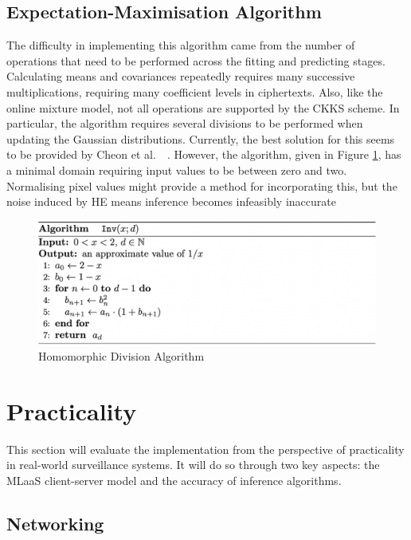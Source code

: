 \subsection{Expectation-Maximisation Algorithm}
\setlength{\leftskip}{0.5cm}
\indent \indent
The difficulty in implementing this algorithm came from the number of operations that need to be performed across the fitting and predicting stages. Calculating means and covariances repeatedly requires many successive multiplications, requiring many coefficient levels in ciphertexts. Also, like the online mixture model, not all operations are supported by the CKKS scheme. In particular, the algorithm requires several divisions to be performed when updating the Gaussian distributions. Currently, the best solution for this seems to be provided by Cheon et al.\ ~\cite{Comparison}. However, the algorithm, given in Figure \ref{fig:division}, has a minimal domain requiring input values to be between zero and two. Normalising pixel values might provide a method for incorporating this, but the noise induced by HE means inference becomes infeasibly inaccurate
\begin{figure}[ht]
    \centering
    \includegraphics[width=\textwidth]{figures/algorithm2}
    \caption{Homomorphic Division Algorithm}
    \label{fig:division}
\end{figure}

\setlength{\leftskip}{0cm}




\section{Practicality}
\setlength{\leftskip}{0.25cm}
\indent \indent
This section will evaluate the implementation from the perspective of practicality in real-world surveillance systems. It will do so through two key aspects: the MLaaS client-server model and the accuracy of inference algorithms.

\setlength{\leftskip}{0cm}
\subsection{Networking}
